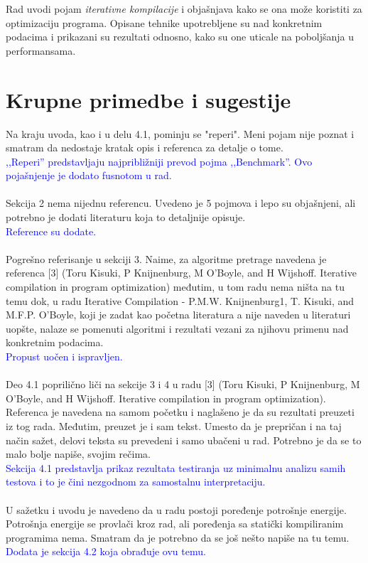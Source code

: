 \documentclass[a4paper]{report}
\newcommand{\odgovor}[1]{\textcolor{blue}{#1}}
\begin{document}
Rad uvodi pojam \textit{iterativne kompilacije} i objašnjava kako se ona može koristiti za optimizaciju programa. Opisane tehnike upotrebljene su nad konkretnim podacima i prikazani su rezultati odnosno, kako su one uticale na poboljšanja u performansama. 

\section{Krupne primedbe i sugestije}

\label{sec: primedbe}

\noindent Na kraju uvoda, kao i u delu 4.1, pominju se "reperi". Meni pojam nije poznat i smatram da nedostaje kratak opis i referenca za detalje o tome.
\\
\odgovor{,,Reperi'' predstavljaju najpribližniji prevod pojma ,,Benchmark''. Ovo pojašnjenje je dodato fusnotom u rad. }
\\
\\
Sekcija 2 nema nijednu referencu. Uvedeno je 5 pojmova i lepo su objašnjeni, ali potrebno je dodati literaturu koja to detaljnije opisuje.
\\
\odgovor{Reference su dodate. }
\\
\\
Pogrešno referisanje u sekciji 3. Naime, za algoritme pretrage navedena je referenca [3] (Toru Kisuki, P Knijnenburg, M O'Boyle, and H Wijshoff. Iterative compilation in program optimization) međutim, u tom radu nema ništa na tu temu dok, u radu Iterative Compilation - P.M.W. Knijnenburg1, T. Kisuki, and M.F.P. O'Boyle, koji je zadat kao početna literatura a nije naveden u literaturi uopšte, nalaze se pomenuti algoritmi i rezultati vezani za njihovu primenu nad konkretnim podacima.
\\
\odgovor{Propust uočen i ispravljen.}
\\
\\
Deo 4.1 poprilično liči na sekcije 3 i 4 u radu  [3] (Toru Kisuki, P Knijnenburg, M O'Boyle, and H Wijshoff. Iterative compilation in program optimization). Referenca je navedena na samom početku i naglašeno je da su rezultati preuzeti iz tog rada. Međutim, preuzet je i sam tekst. Umesto da je prepričan i na taj način sažet, delovi teksta su prevedeni i samo ubačeni u rad. Potrebno je da se to malo bolje napiše, svojim rečima.
\\
\odgovor{Sekcija 4.1 predstavlja prikaz rezultata testiranja uz minimalnu analizu samih testova i to je čini nezgodnom za samostalnu
		 interpretaciju.}
\\
\\
U sažetku i uvodu je navedeno da u radu postoji poređenje potrošnje energije. Potrošnja energije se provlači kroz rad, ali poređenja sa statički kompiliranim programima nema. Smatram da je potrebno da se još nešto napiše na tu temu.
\\
\odgovor{Dodata je sekcija 4.2 koja obrađuje ovu temu.}
\end{document}
